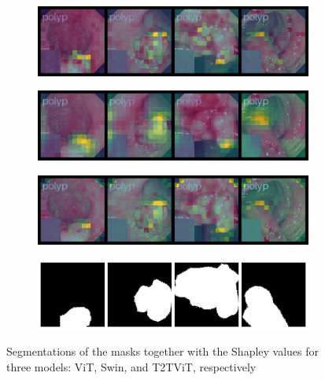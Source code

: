 \documentclass[magisterska,en]{pracamgr}
\begin{document}
\begin{figure}
\centering

\begin{subfigure}{0.55\textwidth}
   \includegraphics[width=1\linewidth]{./images/gastro_shap_for_segm_1.png}
   \caption{}
   \label{fig:Ng2}
\end{subfigure}
\begin{subfigure}{0.55\textwidth}
   \includegraphics[width=1\linewidth]{./images/gastro_shap_for_segm_swin.png}
   \caption{}
   \label{fig:Ng2}
\end{subfigure}
\begin{subfigure}{0.55\textwidth}
   \includegraphics[width=1\linewidth]{./images/gastro_shap_for_segm_t2t_vit.png}
   \caption{}
   \label{fig:Ng2}
\end{subfigure}
\begin{subfigure}{0.55\textwidth}
   \includegraphics[width=1\linewidth]{./images/gastro_segmentation_1.png}
   \caption{}
   \label{fig:Ng1} 
\end{subfigure}



\caption{Segmentations of the masks together with the Shapley values for three models: ViT, Swin, and T2T\textunderscore ViT, respectively}
\label{segm_shap}
\end{figure}
\end{document}
